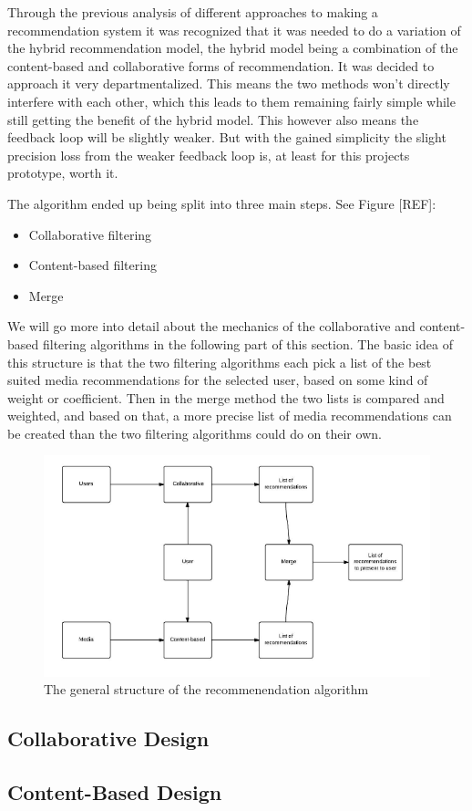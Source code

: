 Through the previous analysis of different approaches to making a recommendation system it was recognized that it was needed to do a variation of the hybrid recommendation model, the hybrid model being a combination of the content-based and collaborative forms of recommendation. It was decided to approach it very departmentalized. This means the two methods won’t directly interfere with each other, which this leads to them remaining fairly simple while still getting the benefit of the hybrid model. This however also means the feedback loop will be slightly weaker. But with the gained simplicity the slight precision loss from the weaker feedback loop is, at least for this projects prototype, worth it.

The algorithm ended up being split into three main steps. See Figure [REF]:
\begin{itemize}
	\item Collaborative filtering
	\item Content-based filtering
	\item Merge
\end{itemize}

We will go more into detail about the mechanics of the collaborative and content-based filtering algorithms in the following part of this section. The basic idea of this structure is that the two filtering algorithms each pick a list of the best suited media recommendations for the selected user, based on some kind of weight or coefficient. Then in the merge method the two lists is compared and weighted, and based on that, a more precise list of media recommendations can be created than the two filtering algorithms could do on their own.

\begin{figure}[htb]
\centering
\includegraphics[width=1\textwidth]{Images/RecommendationAlgo.png}
\caption{The general structure of the recommenendation algorithm}
\label{GenRecAlgo}
\end{figure}

\subsection{Collaborative Design}
\label{CollaborativeDes}

\subsection{Content-Based Design}
\label{ContentBasedDes}
